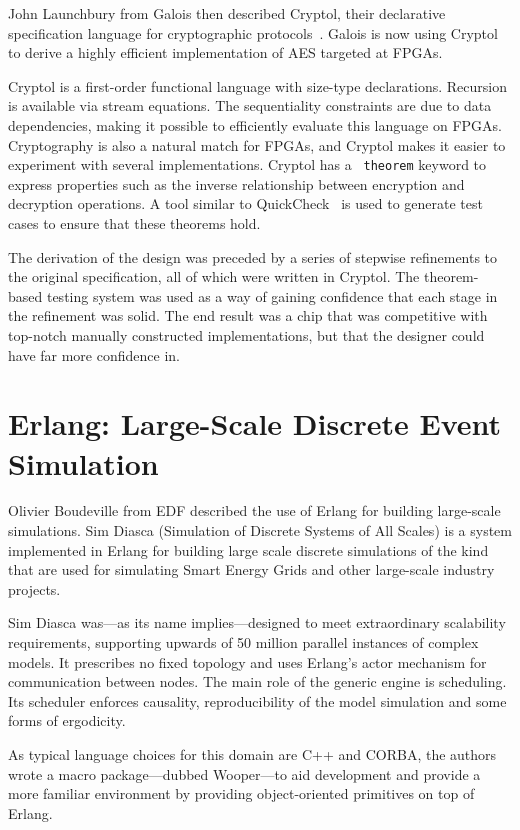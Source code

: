 \documentclass{jfp1}
\begin{document}
John Launchbury from Galois then described Cryptol, their declarative
specification language for cryptographic
protocols~\cite{Erkok:2009:PES:1481848.1481860}.  Galois is now using Cryptol
to derive a highly efficient implementation of AES targeted at FPGAs.

Cryptol is a first-order functional language with size-type declarations.
Recursion is available via stream equations.  The sequentiality constraints are
due to data dependencies, making it possible to efficiently evaluate this
language on FPGAs. Cryptography is also a natural match for FPGAs, and Cryptol
makes it easier to experiment with several implementations. Cryptol has a {\tt
theorem} keyword to express properties such as the inverse relationship between
encryption and decryption operations. A tool similar to
QuickCheck~\cite{Claessen:2000:QLT:351240.351266} is used to generate test
cases to ensure that these theorems hold.

The derivation of the design was preceded by a series of stepwise refinements to
the original specification, all of which were written in Cryptol.  The
theorem-based testing system was used as a way of gaining confidence that each
stage in the refinement was solid.  The end result was a chip that was
competitive with top-notch manually constructed implementations, but that the
designer could have far more confidence in.

\section{Erlang: Large-Scale Discrete Event Simulation}

Olivier Boudeville from EDF described the use of Erlang for building
large-scale simulations.  Sim Diasca (Simulation of Discrete Systems of All
Scales) is a system implemented in Erlang for building large scale discrete
simulations of the kind that are used for simulating Smart Energy Grids and
other large-scale industry projects.

Sim Diasca was---as its name implies---designed to meet extraordinary
scalability requirements, supporting upwards of 50 million parallel instances
of complex models.  It prescribes no fixed topology and uses Erlang's actor
mechanism for communication between nodes.  The main role of the generic engine
is scheduling.  Its scheduler enforces causality, reproducibility of the model
simulation and some forms of ergodicity.

As typical language choices for this domain are C++ and CORBA, the authors
wrote a macro package---dubbed Wooper---to aid development and provide a
more familiar environment by providing object-oriented primitives on top of
Erlang.
\end{document}
